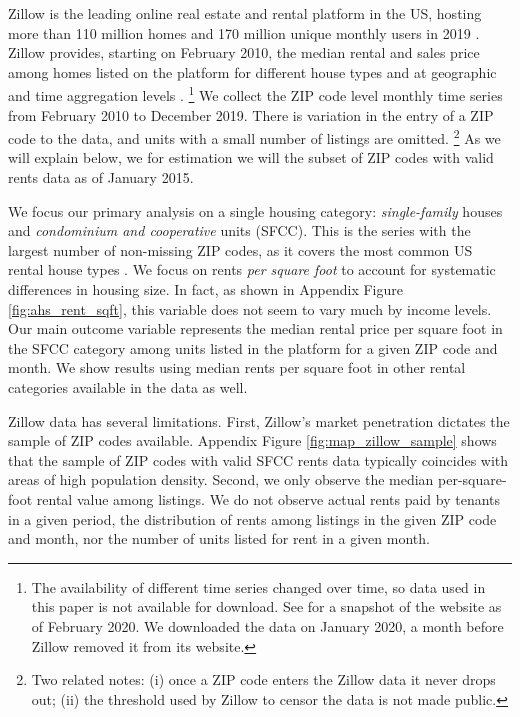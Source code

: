 Zillow is the leading online real estate and rental platform in the US, hosting
more than 110 million homes and 170 million unique monthly users in 2019 
\parencite{ZillowFacts}.
Zillow provides, starting on February 2010, the median rental and sales price 
among homes listed on the platform for different house types and at geographic
and time aggregation levels \parencite{ZillowData}.%
\footnote{The availability of different time series changed over time, so
data used in this paper is not available for download.
See \textcite{ZillowDataArchive} for a snapshot of the website as of 
February 2020.
We downloaded the data on January 2020, a month before Zillow removed it from
its website.} 
We collect the ZIP code level monthly time series from February 2010 to 
December 2019. 
There is variation in the entry of a ZIP code to the data, and units with a small 
number of listings are omitted.%
\footnote{Two related notes:
(i) once a ZIP code enters the Zillow data it never drops out;
(ii) the threshold used by Zillow to censor the data is not made public.}
As we will explain below, we for estimation we will the subset of ZIP codes
with valid rents data as of January 2015.

We focus our primary analysis on a single housing category:
\textit{single-family} houses and \textit{condominium and cooperative} units (SFCC).
This is the series with the largest number of non-missing ZIP codes, as it 
covers the most common US rental house types \parencite{Fernald2020}.
We focus on rents \textit{per square foot} to account for systematic differences
in housing size.
In fact, as shown in Appendix Figure \ref{fig:ahs_rent_sqft}, this variable does 
not seem to vary much by income levels.
Our main outcome variable represents the median rental price per square foot in 
the SFCC category among units listed in the platform for a given ZIP code and 
month.
We show results using median rents per square foot in other rental categories 
available in the data as well.

Zillow data has several limitations.
First, Zillow's market penetration dictates the sample of ZIP codes available.
Appendix Figure \ref{fig:map_zillow_sample} shows that the sample of ZIP codes
with valid SFCC rents data typically coincides with areas of high population 
density.
Second, we only observe the median per-square-foot rental value among listings.
We do not observe actual rents paid by tenants in a given period, 
the distribution of rents among listings in the given ZIP code and month, nor
the number of units listed for rent in a given month.

